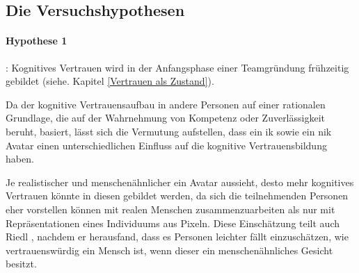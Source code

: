 \documentclass[a4paper,11pt]{article}%
\renewcommand{\\}{\vspace*{0.5\baselineskip} \newline}
\begin{document}
\newpage



\subsection{Die Versuchshypothesen}
\label{VersuchshypothesenAuflistung}

\paragraph{Hypothese 1}:
Kognitives Vertrauen wird in der Anfangsphase einer Teamgründung frühzeitig gebildet (siehe. Kapitel \ref{Vertrauen als Zustand}).

Da der kognitive Vertrauensaufbau in andere Personen auf einer rationalen Grundlage, die auf der Wahrnehmung von Kompetenz oder Zuverlässigkeit beruht, basiert, lässt sich die Vermutung aufstellen, dass ein \ac{ik} sowie ein \ac{nik} Avatar einen unterschiedlichen Einfluss auf die kognitive Vertrauensbildung haben.

Je realistischer und menschenähnlicher ein Avatar aussieht, desto mehr kognitives Vertrauen könnte in diesen gebildet werden, da sich die teilnehmenden Personen eher vorstellen können mit realen Menschen zusammenzuarbeiten als nur mit Repräsentationen eines Individuums aus Pixeln. Diese Einschätzung teilt auch Riedl \citep{riedl2014trusting}, nachdem er herausfand, dass es Personen leichter fällt einzuschätzen, wie vertrauenswürdig ein Mensch ist, wenn dieser ein menschenähnliches Gesicht besitzt.
\end{document}

